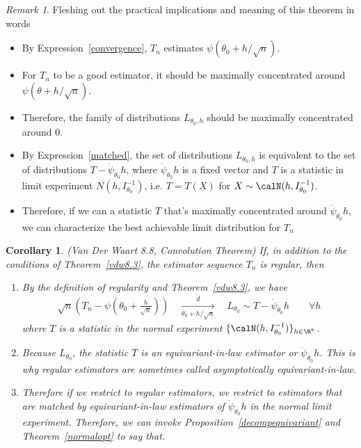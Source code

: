 \documentclass[12pt]{article}
\theoremstyle{plain}
\newtheorem{cor}[thm]{Corollary}
\theoremstyle{definition}
\theoremstyle{remark}
\newtheorem*{rmk}{Remark}
\newcommand{\dto}{\xrightarrow{d}}
\begin{document}
\begin{rmk}
Fleshing out the practical implications and meaning of this theorem in
words
\begin{itemize}
  \item By Expression~\ref{convergence}, $T_n$ estimates
    $\psi(\theta_0+h/\sqrt{n})$.
  \item For $T_n$ to be a good estimator, it should be maximally
    concentrated around $\psi(\theta+h/\sqrt{n})$.
  \item Therefore, the family of distributions $L_{\theta_0,h}$ should
    be maximally concentrated around 0.
  \item By Expression~\ref{matched}, the set of distributions
    $L_{\theta_0,h}$ is equivalent to the set of distributions
    $T-\dot{\psi}_{\theta_0}h$, where $\dot{\psi}_{\theta_0}h$ is a
    fixed vector and $T$ is a statistic in limit experiment
    $N(h,I_{\theta_0}^{-1})$, i.e.
    $T=T(X)$ for $X\sim \calN(h,I_{\theta_0}^{-1})$.
  \item
    Therefore, if we can a statistic $T$ that's maximally concentrated
    around $\dot{\psi}_{\theta_0}h$, we can characterize the best
    achievable limit distribution for $T_n$
\end{itemize}
\end{rmk}


\begin{cor}
\emph{(Van Der Waart 8.8, Convolution Theorem)}
If, in addition to the conditions of Theorem~\ref{vdw8.3}, the estimator
sequence $T_n$ is regular, then
\begin{enumerate}[label=(\roman*)]
  \item By the definition of regularity and Theorem~\ref{vdw8.3},  we
    have
    \begin{align*}
      \sqrt{n}
      \left(
      T_n
      -
      \psi\left(
      \theta_0 + \frac{h}{\sqrt{n}}
      \right)
      \right)
      \quad\underset{\theta_0+h/\sqrt{n}}{\dto}\quad
      L_{\theta_0}
      \sim
      T - \dot{\psi}_{\theta_0} h
      \qquad
      \forall h
    \end{align*}
    where $T$ is a statistic in the normal experiment
    $\{\calN(h,I_{\theta_0}^{-1})\}_{h\in\R^k}$.

  \item Because $L_{\theta_0}$, the statistic $T$ is an
    equivariant-in-law estimator or $\dot{\psi}_{\theta_0}h$.
    This is why regular estimators are sometimes called asymptotically
    equivariant-in-law.

  \item
    Therefore if we restrict to regular estimators, we restrict to
    estimators that are matched by equivariant-in-law estimators of
    $\dot{\psi}_{\theta_0}h$ in the normal limit experiment.
    Therefore, we can invoke Proposition~\ref{decompequivariant} and
    Theorem~\ref{normalopt} to say that.



\end{enumerate}
\end{cor}
\end{document}
